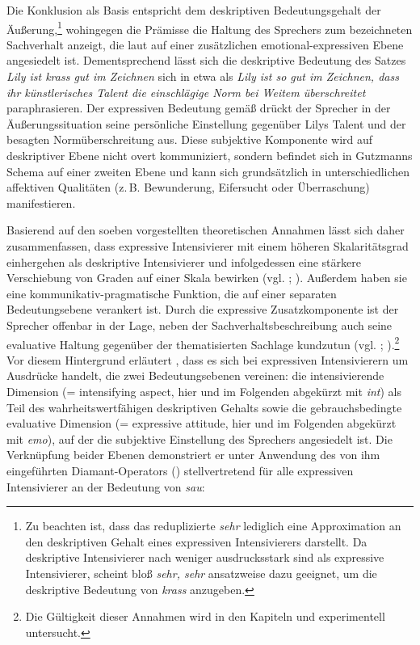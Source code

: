 \noindent Die Konklusion als Basis entspricht dem deskriptiven Bedeutungsgehalt der Äußerung,\footnote{Zu beachten ist, dass das reduplizierte \textit{sehr} lediglich  eine Approximation an den deskriptiven Gehalt eines expressiven Intensivierers darstellt. Da deskriptive Intensivierer nach \citet[133]{Gutzmann.2019a} weniger ausdrucksstark sind als expressive Intensivierer, scheint bloß \textit{sehr, sehr} ansatzweise dazu geeignet, um die deskriptive Bedeutung von {\textit{krass} anzugeben.}} wohingegen die Prämisse die Haltung des Sprechers zum bezeichneten Sachverhalt anzeigt, die laut \citet[20f.]{Gutzmann.2015a} auf einer zusätzlichen emotional-expressiven Ebene angesiedelt ist. Dementsprechend lässt sich die deskriptive Bedeutung des Satzes \textit{Lily ist krass gut im Zeichnen} sich in etwa als \textit{Lily ist so gut im Zeichnen, dass ihr künstlerisches Talent die einschlägige Norm bei Weitem überschreitet} paraphrasieren. Der expressiven Bedeutung gemäß drückt der Sprecher in der Äußerungssituation seine persönliche Einstellung gegenüber Lilys Talent und der besagten Normüberschreitung  aus. Diese subjektive Komponente wird auf deskriptiver Ebene nicht overt kommuniziert, sondern befindet sich in Gutzmanns Schema auf einer zweiten Ebene und kann sich grundsätzlich in unterschiedlichen affektiven Qualitäten (z.\,B. Bewunderung, Eifersucht oder {Überraschung) manifestieren}.

Basierend auf den soeben vorgestellten theoretischen Annahmen lässt sich daher zusammenfassen, dass expressive Intensivierer mit einem höheren Skalaritätsgrad einhergehen als deskriptive Intensivierer und infolgedessen eine stärkere Verschiebung von Graden auf einer
Skala bewirken (vgl. {\citealt[22]{Paradis.1997}}; \citealt[133]{Gutzmann.2019a}). Außerdem haben sie eine kommunikativ-pragmatische Funktion, die auf einer separaten Bedeutungsebene verankert ist. Durch die expressive Zusatzkomponente ist der Sprecher offenbar in der Lage, neben der Sachverhaltsbeschreibung auch seine evaluative Haltung gegenüber der thematisierten Sachlage kundzutun (vgl. \citealt[315]{Lang.1983}; {\citealt[57]{Ortner.2014}}).\footnote{Die Gültigkeit dieser Annahmen wird in den Kapiteln  und  experimentell untersucht.} Vor diesem Hintergrund erläutert {\citet[136]{Gutzmann.2019a}}, dass es sich bei expressiven Intensivierern um Ausdrücke handelt, die zwei Bedeutungsebenen vereinen: die intensivierende Dimension (= \glqq{}intensifying aspect\grqq{}, hier und im Folgenden abgekürzt mit \textit{int}) als Teil des wahrheitswertfähigen deskriptiven Gehalts sowie die gebrauchsbedingte evaluative Dimension (= \glqq{}expressive attitude\grqq{}, hier und im Folgenden abgekürzt mit \textit{emo}), auf der die subjektive Einstellung des Sprechers angesiedelt ist. Die Verknüpfung beider Ebenen demonstriert er unter Anwendung des von ihm eingeführten Diamant-Operators ({{\larger[-1]}}) stellvertretend für alle expressiven Intensivierer an der Bedeutung von \textit{sau}: \medskip


